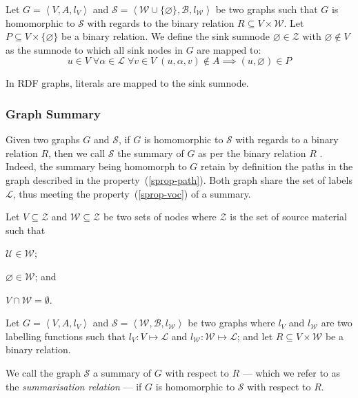 \begin{definition}
Let $G=\left\langle V, A, l_V \right\rangle$ and $\mathcal{S}=\left\langle \mathcal{W} \cup \{ \varnothing \}, \mathcal{B}, l_\mathcal{W} \right\rangle$ be two graphs such that $G$ is homomorphic to $\mathcal{S}$ with regards to the binary relation $R \subseteq V \times \mathcal{W}$.
Let $P \subseteq V \times \{ \varnothing \}$ be a binary relation.
We define the sink sumnode $\varnothing \in \mathcal{Z}$ with $\varnothing \not \in V$ as the sumnode to which all sink nodes in $G$ are mapped to:
$$
u \in V\; \forall \alpha \in \mathcal{L}\; \forall v \in V\; (u, \alpha, v) \not \in A \implies (u, \varnothing) \in P
$$
\end{definition}

\begin{remark}
	In RDF graphs, literals are mapped to the sink sumnode.
\end{remark}

\subsubsection{Graph Summary}

Given two graphs $G$ and $\mathcal{S}$, if $G$ is homomorphic to $\mathcal{S}$ with regards to a binary relation $R$, then we call $\mathcal{S}$ the summary of $G$ as per the binary relation $R$ \cite{campinas:2012:dexa}. Indeed, the summary being homomorph to $G$ retain by definition the paths in the graph described in the property~(\ref{sprop-path}). Both graph share the set of labels $\mathcal{L}$, thus meeting the property~(\ref{sprop-voc}) of a summary.

\begin{definition}
Let $V \subseteq \mathcal{Z}$ and $\mathcal{W} \subseteq \mathcal{Z}$ be two sets of nodes where $\mathcal{Z}$ is the set of source material such that
\begin{inparaenum}[(a)]
	\item $\mathcal{U} \in \mathcal{W}$;
	\item $\varnothing \in \mathcal{W}$; and
	\item $V \cap \mathcal{W} = \emptyset$.
\end{inparaenum}

Let $G=\left\langle V, A, l_V \right\rangle$ and $\mathcal{S}=\left\langle \mathcal{W}, \mathcal{B}, l_\mathcal{W} \right\rangle$ be two graphs where $l_V$ and $l_\mathcal{W}$ are two labelling functions such that $l_V : V \mapsto \mathcal{L}$ and $l_\mathcal{W} : \mathcal{W} \mapsto \mathcal{L}$; and let $R \subseteq V \times \mathcal{W}$ be a binary relation.

We call the graph $\mathcal{S}$ a summary of $G$ with respect to $R$ --- which we refer to as the \emph{summarisation relation} --- if $G$ is homomorphic to $\mathcal{S}$ with respect to $R$.
\end{definition}

